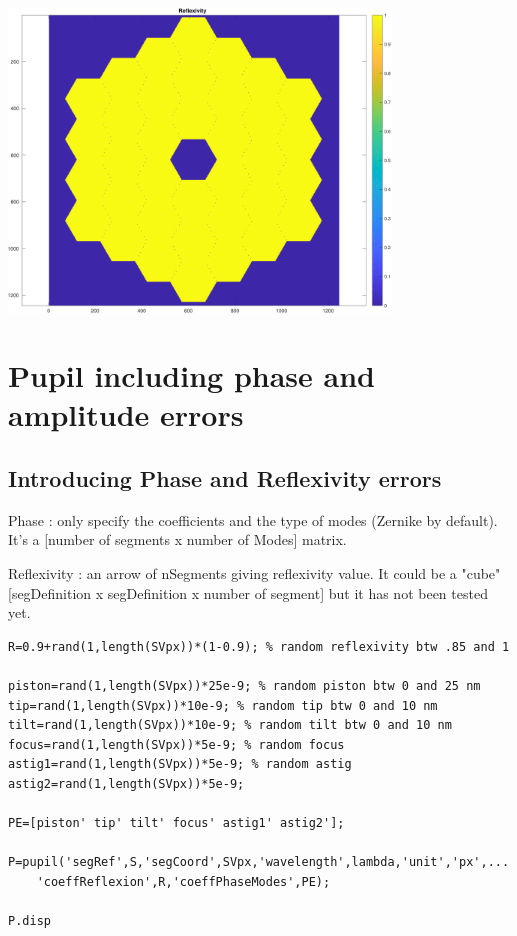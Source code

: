 \documentclass[12pt]{article}
\begin{document}
\includegraphics [width=4in]{docuPupilClass_06.pdf}


\section{Pupil including phase and amplitude errors}

\subsection{Introducing Phase and Reflexivity errors}

\begin{par}
Phase : only specify the coefficients and the type of modes (Zernike by default). It's a  [number of segments  x  number of Modes]   matrix.
\end{par} \vspace{1em}
\begin{par}
Reflexivity : an arrow of nSegments giving reflexivity value. It could be a "cube" [segDefinition x segDefinition x number of segment] but it has not been tested yet.
\end{par} \vspace{1em}
\begin{verbatim}
R=0.9+rand(1,length(SVpx))*(1-0.9); % random reflexivity btw .85 and 1

piston=rand(1,length(SVpx))*25e-9; % random piston btw 0 and 25 nm
tip=rand(1,length(SVpx))*10e-9; % random tip btw 0 and 10 nm
tilt=rand(1,length(SVpx))*10e-9; % random tilt btw 0 and 10 nm
focus=rand(1,length(SVpx))*5e-9; % random focus
astig1=rand(1,length(SVpx))*5e-9; % random astig
astig2=rand(1,length(SVpx))*5e-9;

PE=[piston' tip' tilt' focus' astig1' astig2'];

P=pupil('segRef',S,'segCoord',SVpx,'wavelength',lambda,'unit','px',...
    'coeffReflexion',R,'coeffPhaseModes',PE);

P.disp
\end{verbatim}
\end{document}
